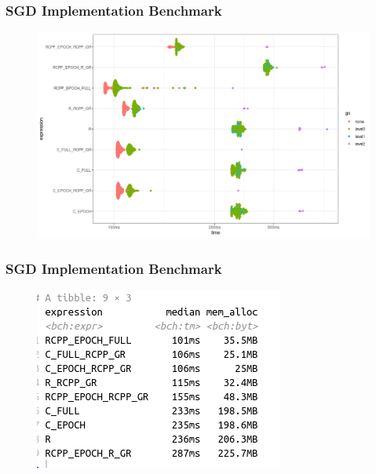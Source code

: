\documentclass[aspectratio=169]{beamer}
\begin{document}
\begin{frame}
    \frametitle{SGD Implementation Benchmark}
    \begin{figure}
        \centering
        \includegraphics[scale = 0.4]{figure/RcppVcVr.png}
    \end{figure}
\end{frame}
\begin{frame}
    \frametitle{SGD Implementation Benchmark}
    \begin{figure}
        \centering
        \includegraphics[scale = 0.6]{figure/table.png}
    \end{figure}
\end{frame}
\end{document}

